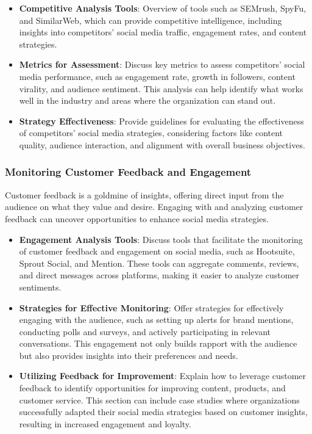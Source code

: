 \documentclass[
]{book}
\providecommand{\tightlist}{%
  \setlength{\itemsep}{0pt}\setlength{\parskip}{0pt}}
\begin{document}
\begin{itemize}
\tightlist
\item
  \textbf{Competitive Analysis Tools}: Overview of tools such as SEMrush, SpyFu, and SimilarWeb, which can provide competitive intelligence, including insights into competitors' social media traffic, engagement rates, and content strategies.
\item
  \textbf{Metrics for Assessment}: Discuss key metrics to assess competitors' social media performance, such as engagement rate, growth in followers, content virality, and audience sentiment. This analysis can help identify what works well in the industry and areas where the organization can stand out.
\item
  \textbf{Strategy Effectiveness}: Provide guidelines for evaluating the effectiveness of competitors' social media strategies, considering factors like content quality, audience interaction, and alignment with overall business objectives.
\end{itemize}

\hypertarget{monitoring-customer-feedback-and-engagement}{%
\subsubsection*{Monitoring Customer Feedback and Engagement}\label{monitoring-customer-feedback-and-engagement}}

Customer feedback is a goldmine of insights, offering direct input from the audience on what they value and desire. Engaging with and analyzing customer feedback can uncover opportunities to enhance social media strategies.

\begin{itemize}
\tightlist
\item
  \textbf{Engagement Analysis Tools}: Discuss tools that facilitate the monitoring of customer feedback and engagement on social media, such as Hootsuite, Sprout Social, and Mention. These tools can aggregate comments, reviews, and direct messages across platforms, making it easier to analyze customer sentiments.
\item
  \textbf{Strategies for Effective Monitoring}: Offer strategies for effectively engaging with the audience, such as setting up alerts for brand mentions, conducting polls and surveys, and actively participating in relevant conversations. This engagement not only builds rapport with the audience but also provides insights into their preferences and needs.
\item
  \textbf{Utilizing Feedback for Improvement}: Explain how to leverage customer feedback to identify opportunities for improving content, products, and customer service. This section can include case studies where organizations successfully adapted their social media strategies based on customer insights, resulting in increased engagement and loyalty.
\end{itemize}
\end{document}
